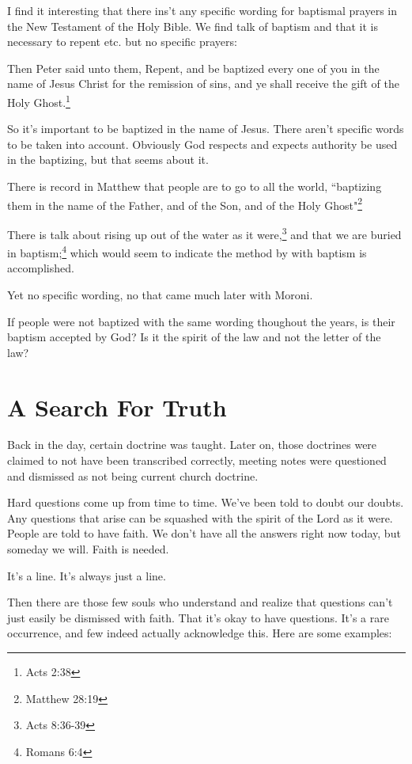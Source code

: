 \documentclass{article}
\begin{document}
I find it interesting that there ins't any specific wording for baptismal
prayers in the New Testament of the Holy Bible. We find talk of baptism and
that it is necessary to repent etc. but no specific prayers:

\begin{displayquote}
Then Peter said unto them, Repent, and be baptized every one of you in the 
name of Jesus Christ for the remission of sins, and ye shall 
receive the gift of the Holy Ghost.\footnote{Acts 2:38}
\end{displayquote}

So it's important to be baptized in the name of Jesus. There aren't specific
words to be taken into account. Obviously God respects and expects authority
be used in the baptizing, but that seems about it.

There is record in Matthew that people are to go to all the world,
``baptizing them in
the name of the Father, 
and of the Son, and of the Holy Ghost"\footnote{Matthew 28:19}

There is talk about rising up out of the water as it 
were,\footnote{Acts 8:36-39} and that we are buried in 
baptism;\footnote{Romans 6:4} which would seem to indicate the method
by with baptism is accomplished.

Yet no specific wording, no that came much later with Moroni.

If people were not baptized with the same wording thoughout the years, is their
baptism accepted by God? Is it the spirit of the law and not the letter of the
law?

\newpage

\section{A Search For Truth}

Back in the day, certain doctrine was taught. Later on, those doctrines were
claimed to not have been transcribed correctly, meeting notes were questioned
and dismissed as not being current church doctrine.

Hard questions come up from time to time. We've been told to doubt our doubts.
Any questions that arise can be squashed with the spirit of the Lord as it were.
People are told to have faith. We don't have all the answers right now today,
but someday we will. Faith is needed.

It's a line. It's always just a line.

Then there are those few souls who understand and realize that questions can't
just easily be dismissed with faith. That it's okay to have questions. It's a
rare occurrence, and few indeed actually acknowledge this. Here are some
examples:
\end{document}

